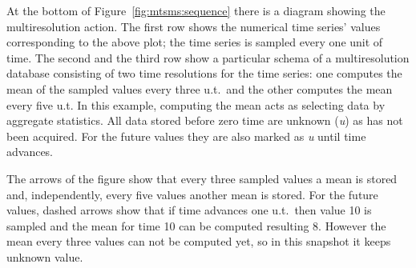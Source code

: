 At the bottom of Figure~\ref{fig:mtsms:sequence} there is a diagram
showing the multiresolution action. The first row shows the numerical
time series' values corresponding to the above plot; the time series
is sampled every one unit of time. The second and the third row show a
particular schema of a multiresolution database consisting of two time
resolutions for the time series: one computes the mean of the sampled
values every three u.t.\ and the other computes the mean every five
u.t. In this example, computing the mean acts as selecting data
by aggregate statistics. All data stored before zero time are unknown
(\emph{u}) as has not been acquired. For the future values they are also
marked as \emph{u} until time advances.

The arrows of the figure show that every three sampled values a mean
is stored and, independently, every five values another mean is
stored. For the future values, dashed arrows show that if time
advances one u.t.\ then value 10 is sampled and the mean for time 10
can be computed resulting 8. However the mean every three values can not
be computed yet, so in this snapshot it keeps unknown value.






